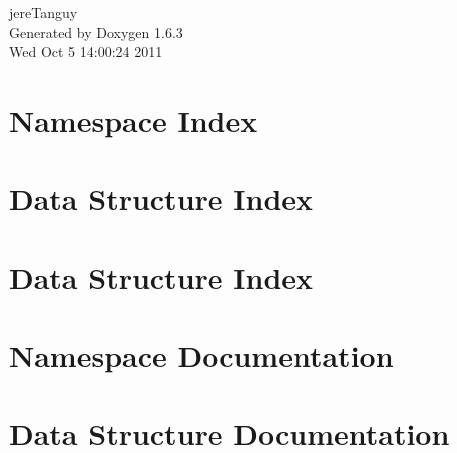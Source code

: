 \documentclass[a4paper]{book}
\begin{document}
\hypersetup{pageanchor=false}
\begin{titlepage}
\vspace*{7cm}
\begin{center}
{\Large jereTanguy }\\
\vspace*{1cm}
{\large Generated by Doxygen 1.6.3}\\
\vspace*{0.5cm}
{\small Wed Oct 5 14:00:24 2011}\\
\end{center}
\end{titlepage}
\clearemptydoublepage
{}
\tableofcontents
\clearemptydoublepage
{}
\hypersetup{pageanchor=true}
\chapter{Namespace Index}

\chapter{Data Structure Index}

\chapter{Data Structure Index}

\chapter{Namespace Documentation}

\chapter{Data Structure Documentation}






\printindex
\end{document}
